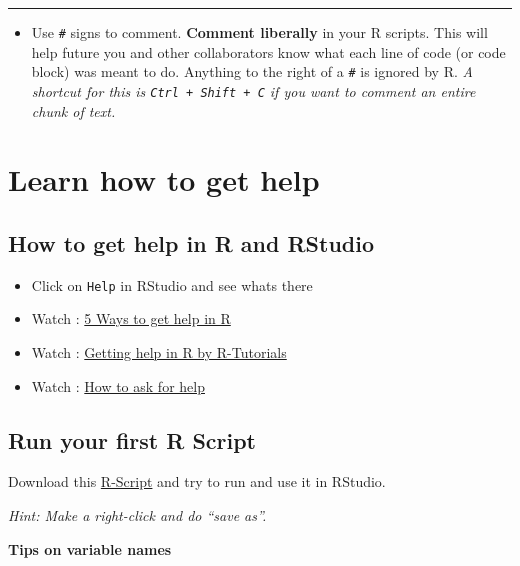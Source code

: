 \documentclass[
]{article}
\providecommand{\tightlist}{%
  \setlength{\itemsep}{0pt}\setlength{\parskip}{0pt}}
\begin{document}
\begin{center}\rule{0.5\linewidth}{0.5pt}\end{center}

\begin{itemize}
\tightlist
\item
  Use \texttt{\#} signs to comment. \textbf{Comment liberally} in your R
  scripts. This will help future you and other collaborators know what
  each line of code (or code block) was meant to do. Anything to the
  right of a \texttt{\#} is ignored by R. \emph{A shortcut for this is
  \texttt{Ctrl\ +\ Shift\ +\ C} if you want to comment an entire chunk
  of text.}
\end{itemize}

\hypertarget{learn-how-to-get-help}{%
\section{Learn how to get help}\label{learn-how-to-get-help}}

\hypertarget{how-to-get-help-in-r-and-rstudio}{%
\subsection{How to get help in R and
RStudio}\label{how-to-get-help-in-r-and-rstudio}}

\begin{itemize}
\tightlist
\item
  Click on \texttt{Help} in RStudio and see whats there
\item
  Watch : \href{https://youtu.be/pc7rig_cxpk}{5 Ways to get help in R}
\item
  Watch : \href{https://youtu.be/bPivdfjdIlY}{Getting help in R by
  R-Tutorials}
\item
  Watch : \href{https://youtu.be/ZFaWxxzouCY}{How to ask for help}
\end{itemize}

\hypertarget{run-your-first-r-script}{%
\subsection{Run your first R Script}\label{run-your-first-r-script}}

Download this
\href{https://raw.githubusercontent.com/hubchev/R-Intro/master/scripts/SH-R-01.R}{R-Script}
and try to run and use it in RStudio.

\emph{Hint: Make a right-click and do ``save as''.}

\textbf{Tips on variable names}
\end{document}
